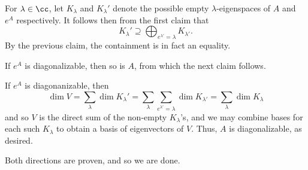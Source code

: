 \documentclass{scrartcl}
\begin{document}
\begin{solution}
        For $\lambda\in \cc$, let $K_\lambda$ and $K_\lambda'$ denote the possible empty $\lambda$-eigenspaces of $A$ and $e^A$ respectively. It follows then from the first claim that 
        \[K_\lambda'\supseteq\bigoplus_{e^{\lambda'}=\lambda} K_{\lambda'}.\]
        By the previous claim, the containment is in fact an equality.
        \begin{lemma}
        If $e^A$ is diagonalizable, then so is $A$, from which the next claim follows.
        \end{lemma}
        \begin{subproof}
        If $e^A$ is diagonanizable, then \[\dim V=\sum_\lambda \dim K_\lambda'=\sum_\lambda \sum_{e^{\lambda'}=\lambda}\dim K_{\lambda'}=\sum_{\lambda}\dim K_\lambda\] and so $V$ is the direct sum of the non-empty $K_\lambda$'s, and we may combine bases for each such $K_\lambda$ to obtain a basis of eigenvectors of $V$. Thus, $A$ is diagonalizable, as desired.
        \end{subproof}
        
        Both directions are proven, and so we are done.
        \end{solution}

\end{document}
